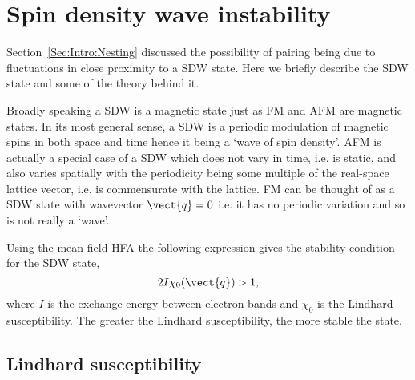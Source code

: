 
\section{Spin density wave instability}
\label{Sec:Theo:SpinDesnityWave}

Section~\ref{Sec:Intro:Nesting} discussed the possibility of \highTc pairing being due to fluctuations in close proximity to a \ac{SDW} state. Here we briefly describe the \ac{SDW} state and some of the theory behind it.

Broadly speaking a \ac{SDW} is a magnetic state just as \ac{FM} and \ac{AFM} are magnetic states. In its most general sense, a \ac{SDW} is a periodic modulation of magnetic spins in both space and time hence it being a `wave of spin density'. \ac{AFM} is actually a special case of a \ac{SDW} which does not vary in time, i.e. is static, and also varies spatially with the periodicity being some multiple of the real-space lattice vector, i.e. is commensurate with the lattice. \ac{FM} can be thought of as a \ac{SDW} state with wavevector $\vect{q}=0$ i.e. it has no periodic variation and so is not really a `wave'.

Using the mean field \ac{HFA} the following expression gives the stability condition for the \ac{SDW} state\cite{Moriya1985},
\begin{equation}
2I\chi_0(\vect{q}) > 1,
\end{equation}
where $I$ is the exchange energy between electron bands and $\chi_0$ is the Lindhard susceptibility. The greater the Lindhard susceptibility, the more stable the state.

\subsection{Lindhard susceptibility}
\label{Sec:Theo:Susceptibility}

